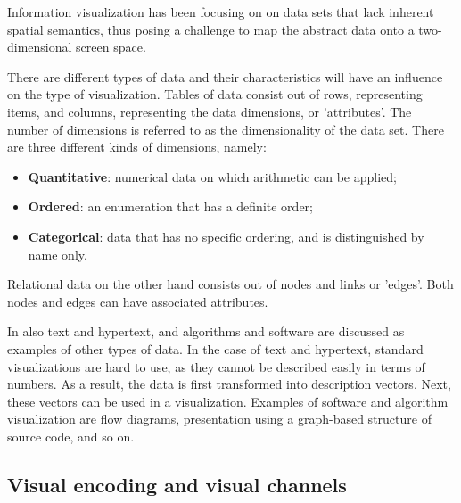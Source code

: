 
Information visualization has been focusing on on data sets that lack inherent spatial semantics, thus posing a challenge to map the abstract data onto a two-dimensional screen space\cite{keim:2002}.

There are different types of data and their characteristics will have an influence on the type of visualization. Tables of data consist out of rows, representing items, and columns, representing the data dimensions, or 'attributes'. The number of dimensions is referred to as the dimensionality of the data set\cite{keim:2002}. There are three different kinds of dimensions, namely\cite{shirley:2009}:

\begin{itemize}
	\item \textbf{Quantitative}: numerical data on which arithmetic can be applied;
	\item \textbf{Ordered}: an enumeration that has a definite order;
	\item \textbf{Categorical}: data that has no specific ordering, and is distinguished by name only.
\end{itemize}

Relational data on the other hand consists out of nodes and links or 'edges'\cite{keim:2002, shirley:2009}. Both nodes and edges can have associated attributes.

In \cite{keim:2002} also text and hypertext, and algorithms and software are discussed as examples of other types of data. In the case of text and hypertext, standard visualizations are hard to use, as they cannot be described easily in terms of numbers. As a result, the data is first transformed into description vectors. Next, these vectors can be used in a visualization. Examples of software and algorithm visualization are flow diagrams, presentation using a graph-based structure of source code, and so on\cite{keim:2002}.


\subsection{Visual encoding and visual channels}\label{chapter:literature_study:section:interaction:subsection:encoding}



